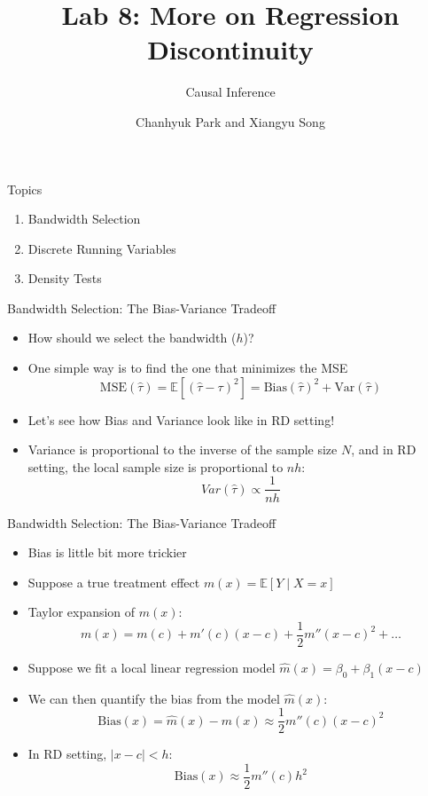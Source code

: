 \documentclass[]{beamer}
\title{Lab 8: More on Regression Discontinuity}
\subtitle{Causal Inference}
\author{Chanhyuk Park and Xiangyu Song}
\institute{Washington University in St. Louis}
\date{}
\begin{document}
\begin{frame}
    \titlepage
\end{frame}

\begin{frame}{Topics}
    \begin{enumerate}[<*>]
        \item Bandwidth Selection
        \vspace{0.3cm}
        \item Discrete Running Variables
        \vspace{0.3cm}
        \item Density Tests
    \end{enumerate}
\end{frame}

\begin{frame}{Bandwidth Selection: The Bias-Variance Tradeoff}
    \begin{itemize}
        \item How should we select the bandwidth ($h$)?
        \item One simple way is to find the one that minimizes the MSE
            $$ 
                \text{MSE}(\hat{\tau}) = \mathbb{E}[(\hat{\tau} - \tau)^2] = \text{Bias}(\hat{\tau})^2 + \text{Var}(\hat{\tau}) 
            $$
        \item Let's see how Bias and Variance look like in RD setting!
            \vspace{1cm}
        \item Variance is proportional to the inverse of the sample size $N$, and in RD setting, the local sample size is proportional to $nh$:
            $$
                Var(\hat{\tau}) \propto \frac{1}{nh}
            $$ 
    \end{itemize}
    
\end{frame}

\begin{frame}{Bandwidth Selection: The Bias-Variance Tradeoff}
    \begin{itemize}
        \item Bias is little bit more trickier
        \item Suppose a true treatment effect $m(x) = \mathbb{E}\left[ Y \mid X = x \right]$
        \item Taylor expansion of $m(x)$:
            $$ 
                m(x) = m(c) + m'(c)(x - c) + \frac{1}{2}m''(x - c)^2 + \ldots
            $$
        \item Suppose we fit a local linear regression model $\hat{m}(x) = \beta_0 + \beta_{1}(x - c)$
        \item We can then quantify the bias from the model $\hat{m}(x)$:
            $$
                \text{Bias}(x) = \hat{m}(x) - m(x) \approx \frac{1}{2} m''(c)(x - c)^2
            $$ 
        \item In RD setting, $\left\lvert x - c \right\rvert < h$:
            $$
                \text{Bias}(x) \approx \frac{1}{2} m''(c)h^2
            $$ 
    \end{itemize}
\end{frame}
\end{document}
